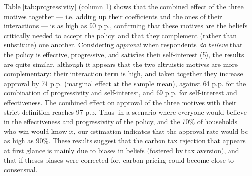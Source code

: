 \documentclass[12pt]{article} %
\providecommand{\DIFaddtex}[1]{{\protect\color{blue}\uwave{#1}}} %
\providecommand{\DIFdeltex}[1]{{\protect\color{red}\sout{#1}}}                      %
\providecommand{\DIFaddbegin}{} %
\providecommand{\DIFaddend}{} %
\providecommand{\DIFdelbegin}{} %
\providecommand{\DIFdelend}{} %
\providecommand{\DIFadd}[1]{\texorpdfstring{\DIFaddtex{#1}}{#1}} %
\providecommand{\DIFdel}[1]{\texorpdfstring{\DIFdeltex{#1}}{}} %
\newcommand{\DIFscaledelfig}{0.5}
\newlength{\DIFdelgraphicswidth} %
\newlength{\DIFdelgraphicsheight} %
\newcommand{\DIFaddincludegraphics}[2][]{{\color{blue}\fbox{\DIFOincludegraphics[#1]{#2}}}} %
\newcommand{\DIFdelincludegraphics}[2][]{%
\sbox{\DIFdelgraphicsbox}{\DIFOincludegraphics[#1]{#2}}%
\settoboxwidth{\DIFdelgraphicswidth}{\DIFdelgraphicsbox} %
\settoboxtotalheight{\DIFdelgraphicsheight}{\DIFdelgraphicsbox} %
\scalebox{\DIFscaledelfig}{%
\parbox[b]{\DIFdelgraphicswidth}{\usebox{\DIFdelgraphicsbox}\\[-\baselineskip] \rule{\DIFdelgraphicswidth}{0em}}\llap{\resizebox{\DIFdelgraphicswidth}{\DIFdelgraphicsheight}{%
\setlength{\unitlength}{\DIFdelgraphicswidth}%
\begin{picture}(1,1)%
\thicklines\linethickness{2pt} %
{\color[rgb]{1,0,0}\put(0,0){\framebox(1,1){}}}%
{\color[rgb]{1,0,0}\put(0,0){\line( 1,1){1}}}%
{\color[rgb]{1,0,0}\put(0,1){\line(1,-1){1}}}%
\end{picture}%
}\hspace*{3pt}}} %
} %
\DeclareRobustCommand{\DIFaddbegin}{\DIFOaddbegin \let\includegraphics\DIFaddincludegraphics} %
\DeclareRobustCommand{\DIFaddend}{\DIFOaddend \let\includegraphics\DIFOincludegraphics} %
\DeclareRobustCommand{\DIFdelbegin}{\DIFOdelbegin \let\includegraphics\DIFdelincludegraphics} %
\DeclareRobustCommand{\DIFdelend}{\DIFOaddend \let\includegraphics\DIFOincludegraphics} %
\begin{document}

Table \ref{tab:progressivity} (column 1) shows that the combined effect of the three motives together --- i.e. adding up their coefficients and the ones of their interactions --- is as high as 90 p.p., confirming that these motives are the beliefs critically needed to accept the policy, and that they complement (rather than substitute) one another. Considering \textit{approval} when respondents \textit{do believe} that the policy is effective, progressive, and satisfies their self-interest (5), the results are quite similar, although it appears that the two altruistic motives are more complementary: their interaction term is high, and taken together they increase approval by 74 p.p. (marginal effect at the sample mean), against 64 p.p. for the combination of progressivity and self-interest, and 69 p.p. for self-interest and effectiveness. The combined effect on approval of the three motives with their strict definition reaches 97 p.p. Thus, in a scenario where everyone would believe in the effectiveness and progressivity of the policy, and the 70\% of households who win would know it, our estimation indicates that the approval rate would be as high as 90\%. These results suggest that the carbon tax rejection that appears at first glance is mainly due to biases in beliefs (fostered by tax aversion), and that if theses biases \DIFdelbegin \DIFdel{were }\DIFdelend \DIFaddbegin \DIFadd{could be }\DIFaddend corrected for, carbon pricing could become close to consensual.
\end{document}
